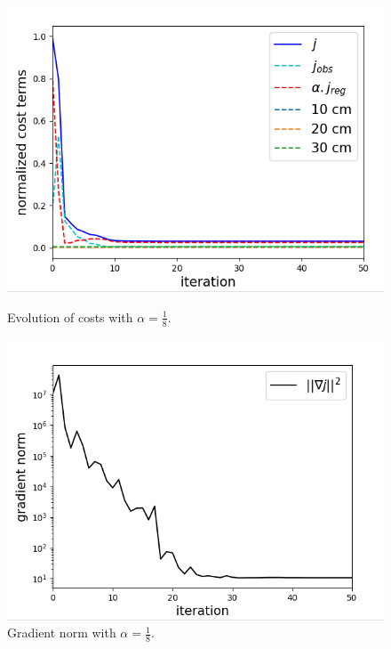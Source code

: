 \documentclass{article}
\begin{document}
\begin{figure}[H]
    \centering
    \begin{minipage}[b]{0.45\linewidth}
        \centering
        \includegraphics[width=\linewidth]{Images_Ayoub/With_Regularisation/Alpha_Const/Graphs/Costs.png}
        \caption{Evolution of costs with \( \alpha = \frac{1}{8} \).}
        \label{fig:wr-costs}
    \end{minipage}
    \hfill
    \begin{minipage}[b]{0.45\linewidth}
        \centering
        \includegraphics[width=\linewidth]{Images_Ayoub/With_Regularisation/Alpha_Const/Graphs/Gradient.png}
        \caption{Gradient norm with \( \alpha = \frac{1}{8} \).}
        \label{fig:wr-gradient}
    \end{minipage}


\end{figure}
\end{document}
